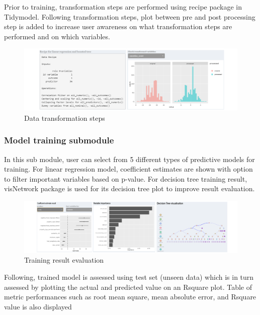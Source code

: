 \documentclass{acm_proc_article-sp}
\begin{document}
Prior to training, transformation steps are performed using recipe
package in Tidymodel. Following transformation steps, plot between pre
and post processing step is added to increase user awareness on what
transformation steps are performed and on which variables.

\begin{figure}[H]

{\centering \includegraphics[width=1\linewidth]{images/recipetrf} 

}

\caption{Data transformation steps}\label{fig:unnamed-chunk-11}
\end{figure}

\hypertarget{model-training-submodule}{%
\subsubsection{Model training
submodule}\label{model-training-submodule}}

In this sub module, user can select from 5 different types of predictive
models for training. For linear regression model, coefficient estimates
are shown with option to filter important variables based on p-value.
For decision tree training result, visNetwork package is used for its
decision tree plot to improve result evaluation.

\begin{figure}[H]

{\centering \includegraphics[width=1\linewidth]{images/mdltrn} 

}

\caption{Training result evaluation}\label{fig:unnamed-chunk-12}
\end{figure}

Following, trained model is assessed using test set (unseen data) which
is in turn assessed by plotting the actual and predicted value on an
Rsquare plot. Table of metric performances such as root mean square,
mean absolute error, and Rsquare value is also displayed
\end{document}
